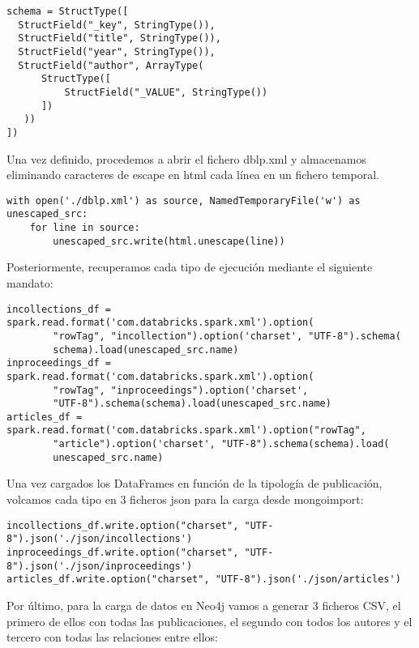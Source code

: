 \begin{verbatim}
schema = StructType([
  StructField("_key", StringType()),
  StructField("title", StringType()),
  StructField("year", StringType()),
  StructField("author", ArrayType(
      StructType([
          StructField("_VALUE", StringType())
      ])
   ))
])
\end{verbatim}

Una vez definido, procedemos a abrir el fichero dblp.xml y almacenamos eliminando caracteres de escape en html cada línea en un fichero temporal.

\begin{verbatim}
with open('./dblp.xml') as source, NamedTemporaryFile('w') as unescaped_src:
    for line in source:
        unescaped_src.write(html.unescape(line))
\end{verbatim}
        
        
Posteriormente, recuperamos cada tipo de ejecución mediante el siguiente mandato:

\begin{verbatim}
incollections_df = spark.read.format('com.databricks.spark.xml').option(
        "rowTag", "incollection").option('charset', "UTF-8").schema(
        schema).load(unescaped_src.name)
inproceedings_df = spark.read.format('com.databricks.spark.xml').option(
        "rowTag", "inproceedings").option('charset',
        "UTF-8").schema(schema).load(unescaped_src.name)
articles_df = spark.read.format('com.databricks.spark.xml').option("rowTag",
        "article").option('charset', "UTF-8").schema(schema).load(
        unescaped_src.name)
\end{verbatim}
        
Una vez cargados los DataFrames en función de la tipología de publicación, volcamos cada tipo en 3 ficheros json para la carga desde mongoimport:


\begin{verbatim}
incollections_df.write.option("charset", "UTF-8").json('./json/incollections')
inproceedings_df.write.option("charset", "UTF-8").json('./json/inproceedings')
articles_df.write.option("charset", "UTF-8").json('./json/articles')
\end{verbatim}

Por último, para la carga de datos en Neo4j vamos a generar 3 ficheros CSV, el primero de ellos con todas las publicaciones, el segundo con todos los autores y el tercero con todas las relaciones entre ellos:

